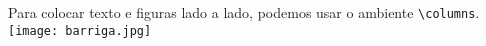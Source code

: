 \begin{columns}
   Para colocar texto e figuras lado a lado,
   podemos usar o ambiente \verb+\columns+.
   \texttt{[image: barriga.jpg]}
\end{columns}
